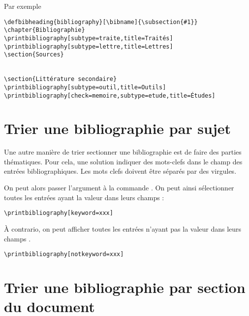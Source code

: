 Par exemple
\begin{verbatim}
\defbibheading{bibliography}[\bibname]{\subsection{#1}}
\chapter{Bibliographie}
\printbibliography[subtype=traite,title=Traités]
\printbibliography[subtype=lettre,title=Lettres]
\section{Sources}


\section{Littérature secondaire}
\printbibliography[subtype=outil,title=Outils]
\printbibliography[check=memoire,subtype=etude,title=Études]

\end{verbatim}

\section{Trier une bibliographie par sujet}

Une autre manière de trier sectionner une bibliographie est de faire des parties thématiques. Pour cela, une solution indiquer des mots-clefs dans le champ  des entrées bibliographiques. Les mots clefs doivent être séparés par des virgules.

On peut alors passer l'argument  à la commande . On peut ainsi sélectionner toutes les entrées ayant la valeur  dans leurs champs  :

\begin{verbatim}
\printbibliography[keyword=xxx]
\end{verbatim}

À contrario, on peut afficher toutes les entrées n'ayant pas la valeur  dans leurs champs .

\begin{verbatim}
\printbibliography[notkeyword=xxx]
\end{verbatim}


\section{Trier une bibliographie par section du document}

